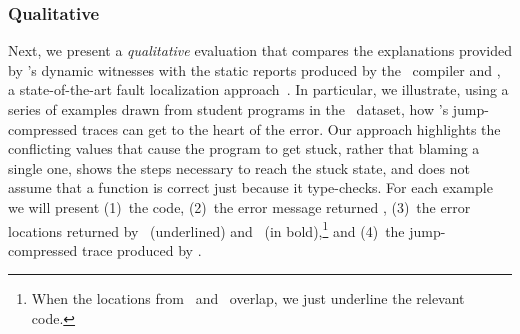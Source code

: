 \subsubsection{Qualitative}\label{sec:advantage-traces}

Next, we present a \emph{qualitative} evaluation that compares
the explanations provided by \toolname's dynamic witnesses with
the static reports produced by the \ocaml\ compiler and \sherrloc,
a state-of-the-art fault localization approach~\cite{Zhang2014-lv}.
%
In particular, we illustrate, using a series of examples drawn
from student programs in the \ucsdbench\ dataset, how \toolname's
jump-compressed traces can get to the heart of the error. Our approach
%
highlights the conflicting values that cause the program to get
stuck, rather that blaming a single one,
%
shows the steps necessary to reach the stuck state, and
%
does not assume that a function is correct just because it type-checks.
%
For each example we will present
(1)~the code,
(2)~the error message returned \ocaml,
(3)~the error locations returned by \ocaml\ (underlined) and \sherrloc\ (in bold),\footnote{When the locations from \ocaml\ and \sherrloc\ overlap,
we just underline the relevant code.}
and (4)~the jump-compressed trace produced by \toolname.




